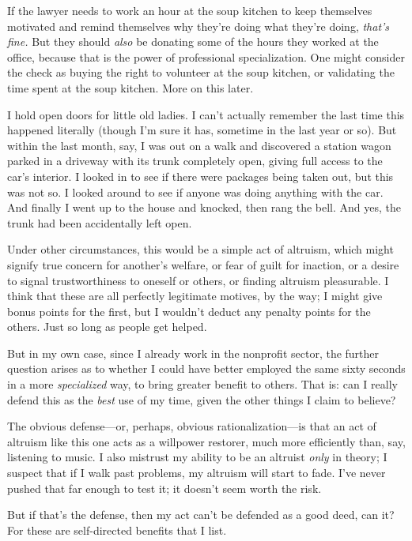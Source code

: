 {
 If the lawyer needs to work an hour at the soup kitchen to keep
themselves motivated and remind themselves why they're
doing what they're doing,
\textit{that's fine.} But they should \textit{also} be
donating some of the hours they worked at the office, because that is
the power of professional specialization. One might consider the check
as buying the right to volunteer at the soup kitchen, or validating the
time spent at the soup kitchen. More on this later.}

{
 I hold open doors for little old ladies. I can't
actually remember the last time this happened literally (though
I'm sure it has, sometime in the last year or so). But
within the last month, say, I was out on a walk and discovered a
station wagon parked in a driveway with its trunk completely open,
giving full access to the car's interior. I looked in
to see if there were packages being taken out, but this was not so. I
looked around to see if anyone was doing anything with the car. And
finally I went up to the house and knocked, then rang the bell. And
yes, the trunk had been accidentally left open.}

{
 Under other circumstances, this would be a simple act of altruism,
which might signify true concern for another's welfare,
or fear of guilt for inaction, or a desire to signal trustworthiness to
oneself or others, or finding altruism pleasurable. I think that these
are all perfectly legitimate motives, by the way; I might give bonus
points for the first, but I wouldn't deduct any penalty
points for the others. Just so long as people get helped.}

{
 But in my own case, since I already work in the nonprofit sector,
the further question arises as to whether I could have better employed
the same sixty seconds in a more \textit{specialized} way, to bring
greater benefit to others. That is: can I really defend this as the
\textit{best} use of my time, given the other things I claim to
believe?}

{
 The obvious defense---or, perhaps, obvious rationalization---is
that an act of altruism like this one acts as a willpower restorer,
much more efficiently than, say, listening to music. I also mistrust my
ability to be an altruist \textit{only} in theory; I suspect that if I
walk past problems, my altruism will start to fade.
I've never pushed that far enough to test it; it
doesn't seem worth the risk.}

{
 But if that's the defense, then my act
can't be defended as a good deed, can it? For these are
self-directed benefits that I list.}

